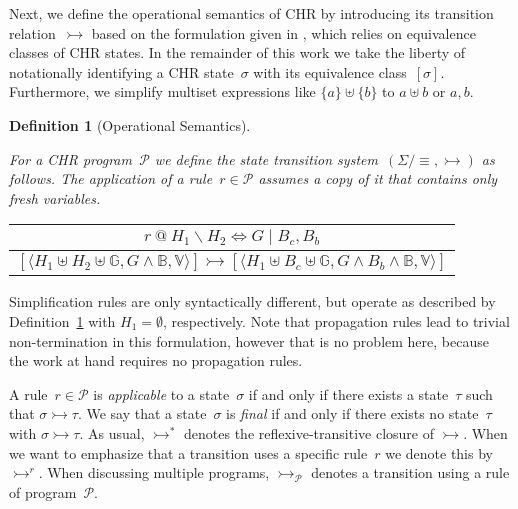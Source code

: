 \documentclass{tlp}
\newtheorem{definition}{Definition}[section]
\newcommand{\st}[3]{\ensuremath{\langle #1 , #2 , #3 \rangle}}
\newcommand{\mcP}{\ensuremath{\mathcal{P}}}
\newcommand{\bbB}{\ensuremath{\mathbb{B}}}
\newcommand{\bbG}{\ensuremath{\mathbb{G}}}
\newcommand{\bbV}{\ensuremath{\mathbb{V}}}
\newcommand{\der}{\ensuremath{\rightarrowtail}}
\begin{document}
Next, we define the operational semantics of CHR by introducing its transition
relation~$\der$ based on the formulation given in \cite{Raiser2009a}, which
relies on equivalence classes of CHR states. In the remainder of this work we
take the liberty of notationally identifying a CHR state~$\sigma$ with its
equivalence class~$[\sigma]$. Furthermore, we simplify multiset expressions like
$\{a\} \uplus \{b\}$ to $a \uplus b$ or $a,b$.

\begin{definition}[Operational Semantics] \label{def:opsem}

For a CHR program~$\mcP$ we define the state transition
system~$(\Sigma/\!\!\equiv, \der)$ as follows. The application of a rule~$r \in
\mcP$ assumes a copy of it that contains only fresh variables.

\begin{center}
\textwidth 9.5cm
\begin{tabular}{c}
$r\ @\ H_1 \backslash H_2 \Leftrightarrow G\mid B_c, B_b$ \\
\hline
$[\st{H_1 \uplus H_2 \uplus \bbG}{G \land \bbB}{\bbV}]
	\der
[\st{H_1 \uplus B_c \uplus \bbG}{G \land B_b \land \bbB}{\bbV}]$
\end{tabular}
\end{center}
\end{definition}

Simplification rules are only syntactically different, but operate as described
by Definition~\ref{def:opsem} with $H_1 = \emptyset$, respectively. Note that
propagation rules lead to trivial non-termination in this formulation, however
that is no problem here, because the work at hand requires no propagation rules.

A rule~$r \in \mcP$ is \emph{applicable} to a state~$\sigma$ if and only if there
exists a state~$\tau$ such that $\sigma \der \tau$. We say that a state~$\sigma$
is \emph{final} if and only if there exists no state~$\tau$ with $\sigma \der
\tau$. As usual, $\der^*$ denotes the reflexive-transitive closure of $\der$.
When we want to emphasize that a transition uses a specific rule~$r$ we denote
this by $\der^r$. When discussing multiple programs, $\der_\mcP$ denotes a
transition using a rule of program~\mcP.
\end{document}
